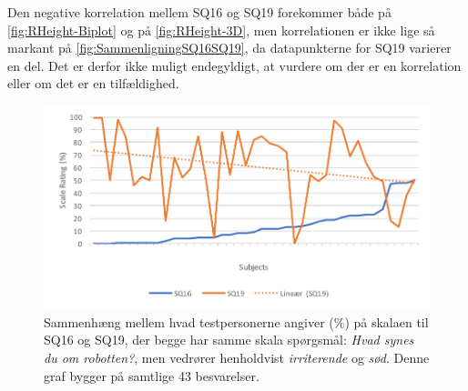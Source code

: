 \noindent
%
Den negative korrelation mellem SQ16 og SQ19 forekommer både på \autoref{fig:RHeight-Biplot} og på \autoref{fig:RHeight-3D}, men korrelationen er ikke lige så markant på \autoref{fig:SammenligningSQ16SQ19}, da datapunkterne for SQ19 varierer en del. Det er derfor ikke muligt endegyldigt, at vurdere om der er en korrelation eller om det er en tilfældighed. 
%
\begin{figure}[H]
	\centering
	\includegraphics[width=\textwidth]{Figure/Korrelationsgrafer/SQ16+SQ19}
	\caption{Sammenhæng mellem hvad testpersonerne angiver (\%) på skalaen til SQ16 og SQ19, der begge har samme skala spørgsmål: \textit{Hvad synes du om robotten?}, men vedrører henholdvist \textit{irriterende} og \textit{sød}. Denne graf bygger på samtlige 43 besvarelser.}
	\label{fig:SammenligningSQ16SQ19}
\end{figure}
\noindent
%



